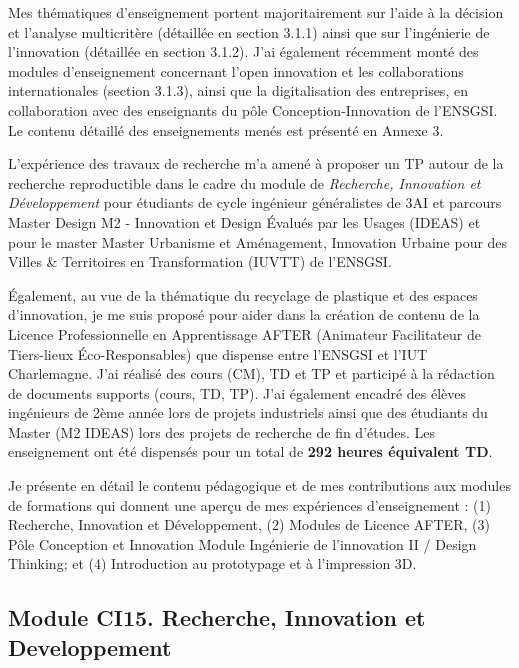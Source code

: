 \documentclass[
  11pt,
]{article}
\begin{document}
Mes thématiques d'enseignement portent majoritairement sur l'aide à la
décision et l'analyse multicritère (détaillée en section 3.1.1) ainsi
que sur l'ingénierie de l'innovation (détaillée en section 3.1.2). J'ai
également récemment monté des modules d'enseignement concernant l'open
innovation et les collaborations internationales (section 3.1.3), ainsi
que la digitalisation des entreprises, en collaboration avec des
enseignants du pôle Conception-Innovation de l'ENSGSI. Le contenu
détaillé des enseignements menés est présenté en Annexe 3.

L'expérience des travaux de recherche m'a amené à proposer un TP autour
de la recherche reproductible dans le cadre du module de
\emph{Recherche, Innovation et Développement} pour étudiants de cycle
ingénieur généralistes de 3AI et parcours Master Design M2 - Innovation
et Design Évalués par les Usages (IDEAS) et pour le master Master
Urbanisme et Aménagement, Innovation Urbaine pour des Villes \&
Territoires en Transformation (IUVTT) de l'ENSGSI.

Également, au vue de la thématique du recyclage de plastique et des
espaces d'innovation, je me suis proposé pour aider dans la création de
contenu de la Licence Professionnelle en Apprentissage AFTER (Animateur
Facilitateur de Tiers-lieux Éco-Responsables) que dispense entre
l'ENSGSI et l'IUT Charlemagne. J'ai réalisé des cours (CM), TD et TP et
participé à la rédaction de documents supports (cours, TD, TP). J'ai
également encadré des élèves ingénieurs de 2ème année lors de projets
industriels ainsi que des étudiants du Master (M2 IDEAS) lors des
projets de recherche de fin d'études. Les enseignement ont été dispensés
pour un total de \textbf{292 heures équivalent TD}.

Je présente en détail le contenu pédagogique et de mes contributions aux
modules de formations qui donnent une aperçu de mes expériences
d'enseignement : (1) Recherche, Innovation et Développement, (2) Modules
de Licence AFTER, (3) Pôle Conception et Innovation Module Ingénierie de
l'innovation II / Design Thinking; et (4) Introduction au prototypage et
à l'impression 3D.

\hypertarget{module-ci15.-recherche-innovation-et-developpement}{%
\subsection{Module CI15. Recherche, Innovation et
Developpement}\label{module-ci15.-recherche-innovation-et-developpement}}
\end{document}
